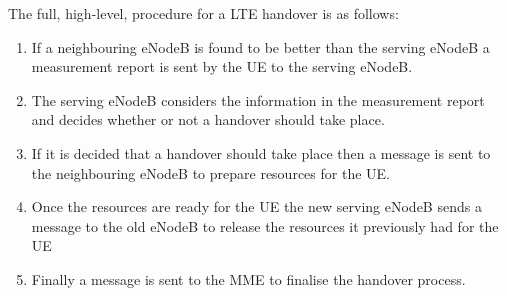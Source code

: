 The full, high-level, procedure for a LTE handover is as follows:
\begin{enumerate}
	\item If a neighbouring eNodeB is found to be better than the serving eNodeB a measurement report is sent by the UE to the serving eNodeB.
	\item The serving eNodeB considers the information in the measurement report and decides whether or not a handover should take place.
	\item If it is decided that a handover should take place then a message is sent to the neighbouring eNodeB to prepare resources for the UE.
	\item Once the resources are ready for the UE the new serving eNodeB sends a message to the old eNodeB to release the resources it previously had for the UE
	\item Finally a message is sent to the MME to finalise the handover process.
\end{enumerate}
